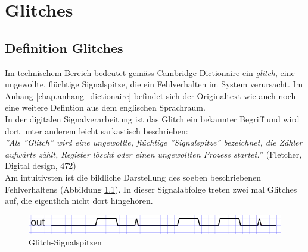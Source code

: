 
\chapter{Glitches}\label{chap.glitch}

\section{Definition Glitches}\label{sect.glitch_def}
Im technischem Bereich bedeutet gemäss Cambridge Dictionaire ein \textit{glitch}, eine ungewollte, flüchtige Signalspitze, die ein Fehlverhalten im System verursacht. Im Anhang \ref{chap.anhang_dictionaire} befindet sich der Originaltext wie auch noch eine weitere Defintion aus dem englischen Sprachraum.\\
\newline
In der digitalen Signalverarbeitung ist das Glitch ein bekannter Begriff und wird dort unter anderem leicht sarkastisch beschrieben:\\
\newline
\textit{''Als ''Glitch''  wird eine ungewollte, flüchtige ''Signalspitze'' bezeichnet, die Zähler aufwärts zählt, Register löscht oder einen ungewollten Prozess startet.}'' (Fletcher, Digital design, 472)\\
\newline
Am intuitivsten ist die bildliche Darstellung des soeben beschriebenen Fehlverhaltens (Abbildung \ref{fig.glitch.def}). In dieser Signalabfolge treten zwei mal Glitches auf, die eigentlich nicht dort hingehören.\\
\begin{figure}[H]
	\centering
	\includegraphics[width=\textwidth]{images/glitch/def_glitch_1.png}
	\caption{Glitch-Signalspitzen}
	\label{fig.glitch.def}
\end{figure}

